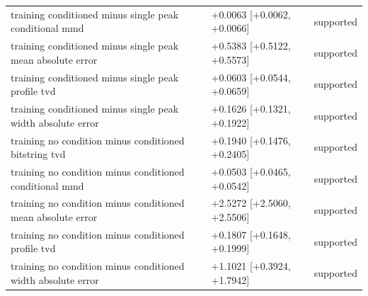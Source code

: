 \begin{table}[p]
\begin{tabular}{@{}p{}p{}p{}@{}}
training conditioned minus single peak conditional mmd & +0.0063 [+0.0062, +0.0066] & supported \\
training conditioned minus single peak mean absolute error & +0.5383 [+0.5122, +0.5573] & supported \\
training conditioned minus single peak profile tvd & +0.0603 [+0.0544, +0.0659] & supported \\
training conditioned minus single peak width absolute error & +0.1626 [+0.1321, +0.1922] & supported \\
training no condition minus conditioned bitstring tvd & +0.1940 [+0.1476, +0.2405] & supported \\
training no condition minus conditioned conditional mmd & +0.0503 [+0.0465, +0.0542] & supported \\
training no condition minus conditioned mean absolute error & +2.5272 [+2.5060, +2.5506] & supported \\
training no condition minus conditioned profile tvd & +0.1807 [+0.1648, +0.1999] & supported \\
training no condition minus conditioned width absolute error & +1.1021 [+0.3924, +1.7942] & supported \\
\bottomrule
\end{tabular}
\end{table}
